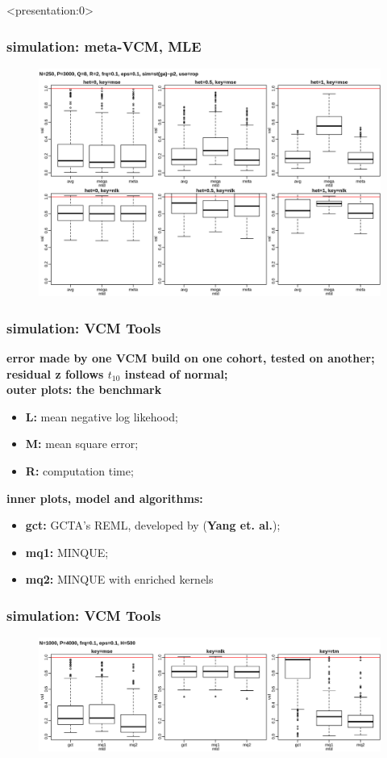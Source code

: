 \documentclass{beamer}
\begin{document}
\begin{frame} <presentation:0>%
  \frametitle{simulation: meta-VCM, MLE} %
  \begin{figure}
    \centering \includegraphics[width=.95\linewidth]{img/jsm_mm3_rop}
  \end{figure}
\end{frame}
\begin{frame}\frametitle{simulation: VCM Tools}
  \textbf{error made by one VCM build on one cohort, tested on another;} \\
  \textbf{residual z follows $t_{10}$ instead of normal;} \\
  {\color{blue}\textbf{outer plots: the benchmark}}
  \begin{itemize}
  \item \textbf{L:} mean negative log likehood;
  \item \textbf{M:} mean square error;
  \item \textbf{R:} computation time;
  \end{itemize}
  {\color{blue}\textbf{inner plots, model and algorithms:}}
  \begin{itemize}
  \item \textbf{gct:} GCTA's REML, developed by (\textbf{Yang et. al.});
  \item \textbf{mq1:} MINQUE;
  \item \textbf{mq2:} MINQUE with enriched kernels
  \end{itemize}
\end{frame}
\begin{frame} \frametitle{simulation: VCM Tools}
  \begin{figure}
    \centering \includegraphics[width=.95\linewidth]{img/jsm_vcm_bmk}
  \end{figure}
\end{frame}
\end{document}

